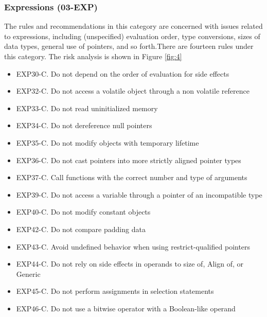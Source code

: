 \subsubsection{Expressions (03-EXP)} The rules and recommendations in this category are concerned with issues related to expressions, including (unspecified) evaluation order, type conversions, sizes of data types, general use of pointers, and so forth.There are fourteen  rules under this category. The risk analysis is shown in Figure \ref{fig:4}\cite{cert-c}
\begin{itemize}
	\item EXP30-C. Do not depend on the order of evaluation for side effects

\item EXP32-C. Do not access a volatile object through a non volatile reference

\item EXP33-C. Do not read uninitialized memory

\item EXP34-C. Do not dereference null pointers

\item EXP35-C. Do not modify objects with temporary lifetime

\item EXP36-C. Do not cast pointers into more strictly aligned pointer types

\item EXP37-C. Call functions with the correct number and type of arguments

\item EXP39-C. Do not access a variable through a pointer of an incompatible type

\item EXP40-C. Do not modify constant objects

\item EXP42-C. Do not compare padding data

\item EXP43-C. Avoid undefined behavior when using restrict-qualified pointers

\item EXP44-C. Do not rely on side effects in operands to size of, Align of, or Generic

\item EXP45-C. Do not perform assignments in selection statements

\item EXP46-C. Do not use a bitwise operator with a Boolean-like operand
\end{itemize}
